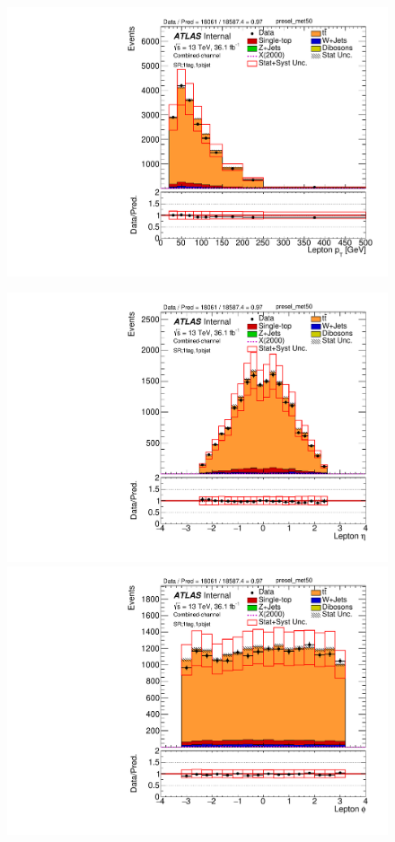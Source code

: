 \begin{figure}[!h]
\begin{center}
\includegraphics[scale=0.33]{./figures/boosted/Plot1tag1pbjet/DataMC_1tag_1pbjet_SR_lepton_presel_met50_LepPt}\\
\par\medskip
\includegraphics[scale=0.33]{./figures/boosted/Plot1tag1pbjet/DataMC_1tag_1pbjet_SR_lepton_presel_met50_LepEta}
\includegraphics[scale=0.33]{./figures/boosted/Plot1tag1pbjet/DataMC_1tag_1pbjet_SR_lepton_presel_met50_LepPhi} 

\end{center}
\end{figure}
